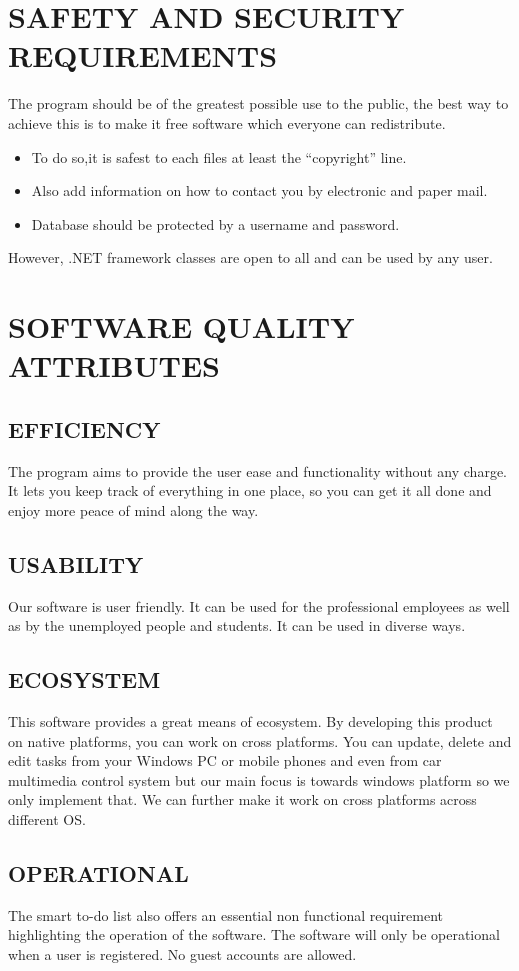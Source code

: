\documentclass[12pt, a4paper]{report}
\begin{document}
\begin{enumerate}
\section{SAFETY AND SECURITY REQUIREMENTS  }
The program should be of the greatest possible use to the public, the best way to achieve this is to make it free software which everyone can redistribute.
\begin{itemize}
	\item To do so,it is safest to each files at least the “copyright” line.
	\item Also add information on how to contact you by electronic and paper mail.
	\item Database should be protected by a username and password.
\end{itemize}
However, .NET framework classes are open to all and can be used by any user. 
\section{SOFTWARE QUALITY ATTRIBUTES }
\subsection{EFFICIENCY}
The program aims to provide the user ease and functionality without any charge. It lets you keep track of everything in one place, so you can get it all done and enjoy more peace of mind along the way.
\subsection{USABILITY}
Our software is user friendly. It can be used for the professional employees as well as by the unemployed people and students. It can be used in diverse ways.
\subsection{ECOSYSTEM}
This software provides a great means of ecosystem. By developing this product on native platforms, you can work on cross platforms. You can update, delete and edit tasks from your Windows PC or mobile phones and even from car multimedia control system but our main focus is towards windows platform so we only implement that. We can further make it work on cross platforms across different OS.
\subsection{OPERATIONAL}
The smart to-do list also offers an essential non functional requirement highlighting the operation of the software. The software will only be operational when a user is registered. No guest accounts are allowed.


\end{enumerate}
\end{document}
